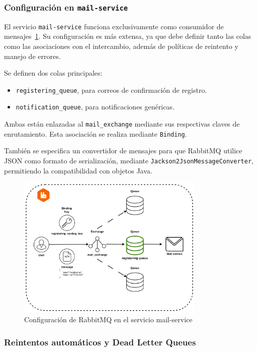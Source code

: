 \subsubsection{Configuración en \texttt{mail-service}}

El servicio \texttt{mail-service} funciona exclusivamente como consumidor de mensajes~\ref{fig:rabbitmq-config}. Su configuración es más extensa, ya que debe definir tanto las colas como las asociaciones con el intercambio, además de políticas de reintento y manejo de errores.

Se definen dos colas principales:
\begin{itemize}
  \item \texttt{registering\_queue}, para correos de confirmación de registro.
  \item \texttt{notification\_queue}, para notificaciones genéricas.
\end{itemize}

Ambas están enlazadas al \texttt{mail\_exchange} mediante sus respectivas claves de enrutamiento. Esta asociación se realiza mediante \texttt{Binding}.

También se especifica un convertidor de mensajes para que RabbitMQ utilice JSON como formato de serialización, mediante \texttt{Jackson2JsonMessageConverter}, permitiendo la compatibilidad con objetos Java.

\begin{figure}[H]
    \centering
    \includegraphics[width=0.8\textwidth]{figures/07_rabbit.png}
    \caption{Configuración de RabbitMQ en el servicio mail-service}
    \label{fig:rabbitmq-config}
\end{figure}

\subsubsection{Reintentos automáticos y Dead Letter Queues}

